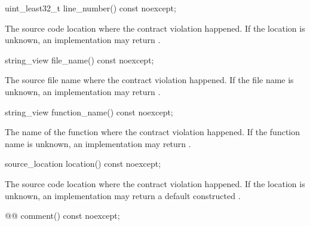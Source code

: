 \documentclass{wg21}
\begin{document}
\begin{removedblock}
\begin{itemdecl}
	uint_least32_t line_number() const noexcept;
\end{itemdecl}

\begin{itemdescr}
	\pnum
	\returns The source code location
	where the contract violation happened.
	If the location is unknown, an implementation may return .
\end{itemdescr}

%
\begin{itemdecl}
	string_view file_name() const noexcept;
\end{itemdecl}

\begin{itemdescr}
	\pnum
	\returns The source file name
	where the contract violation happened.
	If the file name is unknown,
	an implementation may return .
\end{itemdescr}

%
\begin{itemdecl}
	string_view function_name() const noexcept;
\end{itemdecl}

\begin{itemdescr}
	\pnum
	\returns The name of the function
	where the contract violation happened.
	If the function name is unknown,
	an implementation may return .
\end{itemdescr}

\end{removedblock}

\begin{addedblock}
\begin{itemdecl}
	source_location location() const noexcept;
\end{itemdecl}

\begin{itemdescr}
	\pnum
	\returns The source code location
	where the contract violation happened.
	If the location is unknown, an implementation may return a default constructed .
\end{itemdescr}
\end{addedblock}

%
\begin{itemdecl}
	@@ comment() const noexcept;
\end{itemdecl}
\end{document}
